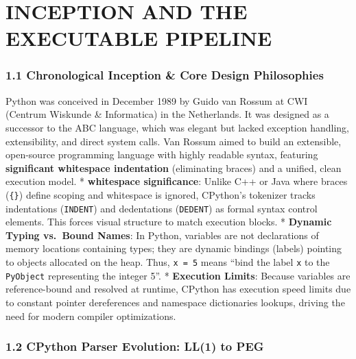 \hypertarget{inception-and-the-executable-pipeline}{%
\chapter{INCEPTION AND THE EXECUTABLE
PIPELINE}\label{inception-and-the-executable-pipeline}}

\hypertarget{chronological-inception-core-design-philosophies}{%
\subsection{1.1 Chronological Inception \& Core Design
Philosophies}\label{chronological-inception-core-design-philosophies}}

Python was conceived in December 1989 by Guido van Rossum at CWI
(Centrum Wiskunde \& Informatica) in the Netherlands. It was designed as
a successor to the ABC language, which was elegant but lacked exception
handling, extensibility, and direct system calls. Van Rossum aimed to
build an extensible, open-source programming language with highly
readable syntax, featuring \textbf{significant whitespace indentation}
(eliminating braces) and a unified, clean execution model. *
\textbf{whitespace significance}: Unlike C++ or Java where braces
(\passthrough{\lstinline!\{\}!}) define scoping and whitespace is
ignored, CPython's tokenizer tracks indentations
(\passthrough{\lstinline!INDENT!}) and dedentations
(\passthrough{\lstinline!DEDENT!}) as formal syntax control elements.
This forces visual structure to match execution blocks. *
\textbf{Dynamic Typing vs.~Bound Names}: In Python, variables are not
declarations of memory locations containing types; they are dynamic
bindings (labels) pointing to objects allocated on the heap. Thus,
\passthrough{\lstinline!x = 5!} means ``bind the label
\passthrough{\lstinline!x!} to the \passthrough{\lstinline!PyObject!}
representing the integer 5''. * \textbf{Execution Limits}: Because
variables are reference-bound and resolved at runtime, CPython has
execution speed limits due to constant pointer dereferences and
namespace dictionaries lookups, driving the need for modern compiler
optimizations.

\hypertarget{cpython-parser-evolution-ll1-to-peg}{%
\subsection{1.2 CPython Parser Evolution: LL(1) to
PEG}\label{cpython-parser-evolution-ll1-to-peg}}

